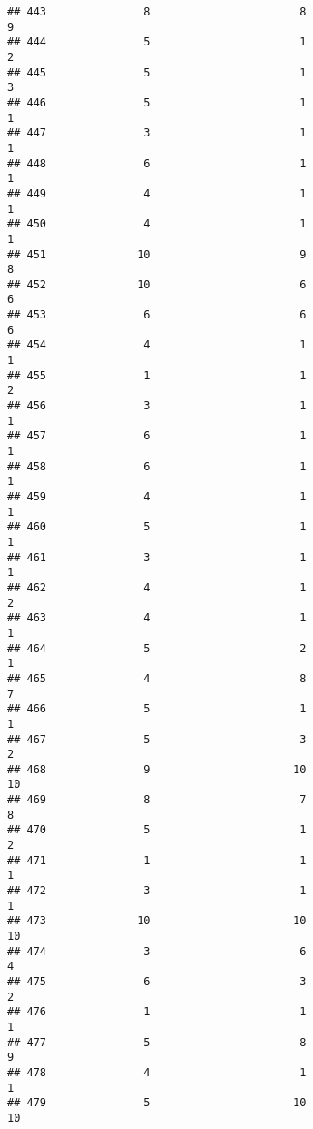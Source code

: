 \documentclass[
]{article}
\begin{document}
\begin{verbatim}
## 443               8                       8                        9
## 444               5                       1                        2
## 445               5                       1                        3
## 446               5                       1                        1
## 447               3                       1                        1
## 448               6                       1                        1
## 449               4                       1                        1
## 450               4                       1                        1
## 451              10                       9                        8
## 452              10                       6                        6
## 453               6                       6                        6
## 454               4                       1                        1
## 455               1                       1                        2
## 456               3                       1                        1
## 457               6                       1                        1
## 458               6                       1                        1
## 459               4                       1                        1
## 460               5                       1                        1
## 461               3                       1                        1
## 462               4                       1                        2
## 463               4                       1                        1
## 464               5                       2                        1
## 465               4                       8                        7
## 466               5                       1                        1
## 467               5                       3                        2
## 468               9                      10                       10
## 469               8                       7                        8
## 470               5                       1                        2
## 471               1                       1                        1
## 472               3                       1                        1
## 473              10                      10                       10
## 474               3                       6                        4
## 475               6                       3                        2
## 476               1                       1                        1
## 477               5                       8                        9
## 478               4                       1                        1
## 479               5                      10                       10

\end{verbatim}
\end{document}
